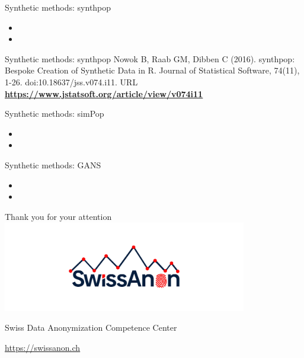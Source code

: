\documentclass[
  ignorenonframetext,
  aspectratio=169,
]{beamer}
\begin{document}
\begin{frame}{Synthetic methods: synthpop}
\protect\hypertarget{synthetic-methods-synthpop}{}
\begin{itemize}
\item
  \color{red}{Generating synthetic data with synthpop}
\item
  \Huge \color{red}{for Jiri/Oscar}
\end{itemize}
\end{frame}

\begin{frame}{Synthetic methods: synthpop}
\protect\hypertarget{synthetic-methods-synthpop-1}{}
Nowok B, Raab GM, Dibben C (2016). synthpop: Bespoke Creation of
Synthetic Data in R. Journal of Statistical Software, 74(11), 1-26.
doi:10.18637/jss.v074.i11. URL
\href{https://www.jstatsoft.org/article/view/v074i11}{\color{blue}\underline{\textbf{https://www.jstatsoft.org/article/view/v074i11}}}
\end{frame}

\begin{frame}{Synthetic methods: simPop}
\protect\hypertarget{synthetic-methods-simpop}{}
\begin{itemize}
\item
  \color{red}{Generating synthetic data with simPop}
\item
  \Huge \color{red}{for Jiri/Oscar}
\end{itemize}
\end{frame}

\begin{frame}{Synthetic methods: GANS}
\protect\hypertarget{synthetic-methods-gans}{}
\begin{itemize}
\item
  \color{red}{Generating synthetic data with GANs}
\item
  \Huge \color{red}{for Marco}
\end{itemize}
\end{frame}

\begin{frame}{}
\protect\hypertarget{section}{}
\centering

\Huge Thank you for your attention\\

\includegraphics[width=0.8\textwidth,height=\textheight]{style/SwissAnon.png}

\large Swiss Data Anonymization Competence Center

\href{https://swissanon.ch}{\color{blue}\underline{https://swissanon.ch}}
\end{frame}
\end{document}
